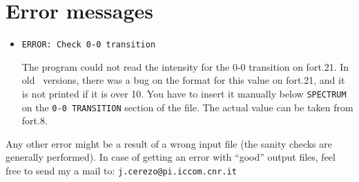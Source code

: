 \documentclass[a4paper,11pt]{article}
\begin{document}
\section{Error messages}

\begin{itemize}
 \item \texttt{ERROR: Check 0-0 transition}

The program could not read the intensity for the 0-0 transition on fort.21. In old \fcc\ versions, there was a bug on the format for this value on fort.21, and it is not printed if it is over 10. You have to insert it manually below \texttt{SPECTRUM} on the \texttt{0-0 TRANSITION} section of the file. The actual value can be taken from fort.8. 
\end{itemize}

Any other error might be a result of a wrong input file (the sanity checks are generally performed). In case of getting an error with ``good'' output files, feel free to send my a mail to: \texttt{j.cerezo@pi.iccom.cnr.it}
\end{document}
